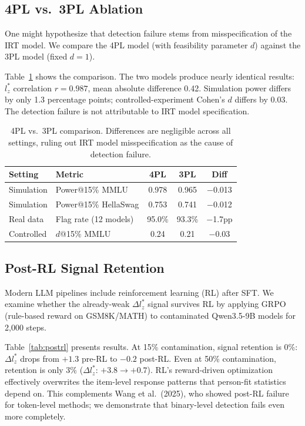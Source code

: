 \documentclass[11pt,a4paper]{article}
\begin{document}
\subsection{4PL vs.\ 3PL Ablation}

One might hypothesize that detection failure stems from misspecification of the IRT model.
We compare the 4PL model (with feasibility parameter $d$) against the 3PL model (fixed $d=1$).

Table~\ref{tab:4pl3pl} shows the comparison.
The two models produce nearly identical results: $l_{z}^{*}$ correlation $r = 0.987$, mean absolute difference 0.42.
Simulation power differs by only 1.3 percentage points; controlled-experiment Cohen's $d$ differs by 0.03.
The detection failure is not attributable to IRT model specification.

\begin{table}[t]
\centering
\small
\begin{tabular}{llccc}
\toprule
Setting & Metric & 4PL & 3PL & Diff \\
\midrule
Simulation & Power@15\% MMLU & 0.978 & 0.965 & $-$0.013 \\
Simulation & Power@15\% HellaSwag & 0.753 & 0.741 & $-$0.012 \\
Real data & Flag rate (12 models) & 95.0\% & 93.3\% & $-$1.7pp \\
Controlled & $d$@15\% MMLU & 0.24 & 0.21 & $-$0.03 \\
\bottomrule
\end{tabular}
\caption{4PL vs.\ 3PL comparison. Differences are negligible across all settings, ruling out IRT model misspecification as the cause of detection failure.}
\label{tab:4pl3pl}
\end{table}

\subsection{Post-RL Signal Retention}
\label{sec:postrl}

Modern LLM pipelines include reinforcement learning (RL) after SFT.
We examine whether the already-weak $\Delta l_{z}^{*}$ signal survives RL by applying GRPO (rule-based reward on GSM8K/MATH) to contaminated Qwen3.5-9B models for 2{,}000 steps.

Table~\ref{tab:postrl} presents results.
At 15\% contamination, signal retention is 0\%: $\Delta l_{z}^{*}$ drops from $+1.3$ pre-RL to $-0.2$ post-RL.
Even at 50\% contamination, retention is only 3\% ($\Delta l_{z}^{*}$: $+3.8 \to +0.7$).
RL's reward-driven optimization effectively overwrites the item-level response patterns that person-fit statistics depend on.
This complements Wang et al.\ (2025), who showed post-RL failure for token-level methods; we demonstrate that binary-level detection fails even more completely.
\end{document}
